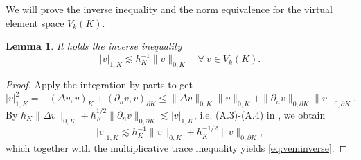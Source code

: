 \documentclass[10pt]{amsart}
\newtheorem{lemma}[theorem]{Lemma}
\numberwithin{equation}{section}
\begin{document}
We will prove the inverse inequality and the norm equivalence for the virtual element space $V_k(K)$.
\begin{lemma}\label{lem:veminverse}
It holds the inverse inequality
\begin{equation}\label{eq:veminverse}
|v|_{1,K}\lesssim h_K^{-1}\|v\|_{0,K}\quad\forall~v\in V_k(K).  
\end{equation}
\end{lemma}
\begin{proof}
Apply the integration by parts to get
$$
|v|_{1,K}^2=-(\Delta v,v)_K+(\partial_nv,v)_{\partial K}\leq\|\Delta v\|_{0,K}\|v\|_{0,K}+\|\partial_nv\|_{0,\partial K}\|v\|_{0,\partial K}.
$$
By $h_K\|\Delta v\|_{0,K}+h_K^{1/2}\|\partial_nv\|_{0,\partial K}\lesssim |v|_{1,K}$, i.e. (A.3)-(A.4) in \cite{ChenHuang2020ncvem}, we obtain
$$
|v|_{1,K}\lesssim h_K^{-1}\|v\|_{0,K}+h_K^{-1/2}\|v\|_{0,\partial K},
$$
which together with the multiplicative trace inequality yields \eqref{eq:veminverse}.
\end{proof}
\end{document}
